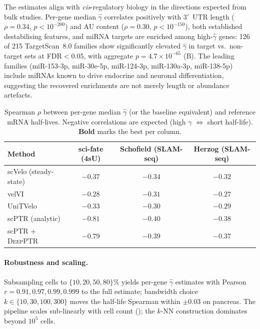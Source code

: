 \documentclass{article}
\begin{document}
The estimates align with \textit{cis}-regulatory biology in the directions
expected from bulk studies. Per-gene median $\widehat\gamma$ correlates
positively with 3$'$~UTR length ($\rho{=}0.34$, $p{<}10^{-200}$) and AU
content ($\rho{=}0.30$, $p{<}10^{-150}$), both established destabilising
features, and miRNA targets are enriched among high-$\widehat\gamma$
genes: 126 of 215 TargetScan~8.0 families show significantly elevated
$\widehat\gamma$ in target vs.\ non-target sets at FDR$<0.05$, with
aggregate $p{=}4.7{\times}10^{-65}$ (B). The leading
families (miR-153-3p, miR-30e-5p, miR-124-3p, miR-130a-3p, miR-138-5p)
include miRNAs known to drive endocrine and neuronal differentiation,
suggesting the recovered enrichments are not merely length or
abundance artefacts.

\begin{table}[t]
  \centering
  \small
  \caption{Spearman $\rho$ between per-gene median $\widehat\gamma$ (or the
  baseline equivalent) and reference mRNA half-lives. Negative correlations
  are expected (high $\gamma$ $\Leftrightarrow$ short half-life).
  \textbf{Bold} marks the best per column.}
  \label{tab:halflife}
  \begin{tabular}{lccc}
    \toprule
    Method & sci-fate (4sU) & Schofield (SLAM-seq) & Herzog (SLAM-seq) \\
    \midrule
    scVelo (steady-state) & $-0.37$ & $-0.34$ & $-0.32$ \\
    velVI                  & $-0.28$ & $-0.31$ & $-0.27$ \\
    UniTVelo               & $-0.33$ & $-0.30$ & $-0.29$ \\
    scPTR (analytic)       & $\mathbf{-0.81}$ & $\mathbf{-0.40}$ & $\mathbf{-0.38}$ \\
    scPTR + \textsc{DeepPTR} & $-0.79$ & $-0.39$ & $-0.37$ \\
    \bottomrule
  \end{tabular}
\end{table}

\paragraph{Robustness and scaling.} Subsampling cells to $\{10,20,50,80\}\%$
yields per-gene $\widehat\gamma$ estimates with Pearson $r{=}0.91, 0.97, 0.99,
0.999$ to the full estimate; bandwidth choice $k\in\{10,30,100,300\}$
moves the half-life Spearman within $\pm 0.03$ on pancreas. The pipeline
scales sub-linearly with cell count (); the $k$-NN
construction dominates beyond $10^5$ cells.
\end{document}
